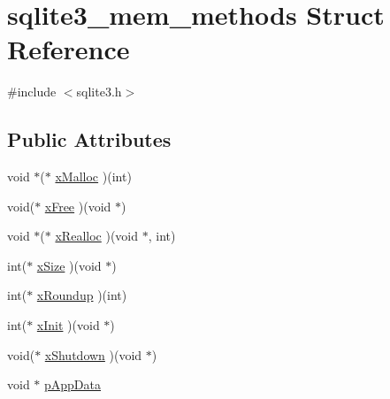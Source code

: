 \hypertarget{structsqlite3__mem__methods}{\section{sqlite3\-\_\-mem\-\_\-methods Struct Reference}
\label{structsqlite3__mem__methods}
}


{\ttfamily \#include $<$sqlite3.\-h$>$}

\subsection*{Public Attributes}
\begin{DoxyCompactItemize}
\item 
void $\ast$($\ast$ \hyperlink{structsqlite3__mem__methods_acb9151cf501c851b61ab6b378832b159}{x\-Malloc} )(int)
\item 
void($\ast$ \hyperlink{structsqlite3__mem__methods_aa2e7fe8d030adaa17fd23a44fec1eca1}{x\-Free} )(void $\ast$)
\item 
void $\ast$($\ast$ \hyperlink{structsqlite3__mem__methods_a5bb7e62164d0934888473c618c61dc77}{x\-Realloc} )(void $\ast$, int)
\item 
int($\ast$ \hyperlink{structsqlite3__mem__methods_a6c68275b577d66ae659ef30344c8f86c}{x\-Size} )(void $\ast$)
\item 
int($\ast$ \hyperlink{structsqlite3__mem__methods_a8b3f0d1ddeb498c4aaf9bbce5b92a268}{x\-Roundup} )(int)
\item 
int($\ast$ \hyperlink{structsqlite3__mem__methods_ad0997b548928358d655000b6ac825cf4}{x\-Init} )(void $\ast$)
\item 
void($\ast$ \hyperlink{structsqlite3__mem__methods_a6f48100692bd935d7f3dbb8c701ab6ca}{x\-Shutdown} )(void $\ast$)
\item 
void $\ast$ \hyperlink{structsqlite3__mem__methods_af91b7adfa1f6aace0b129bac800bd444}{p\-App\-Data}
\end{DoxyCompactItemize}


